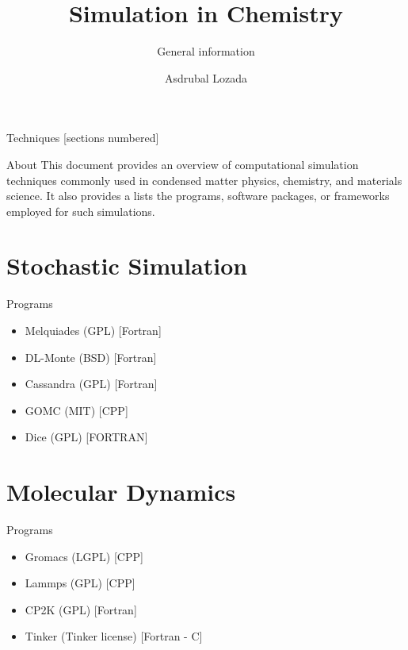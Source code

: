 \documentclass[10pt]{beamer}
\title{Simulation in Chemistry}
\subtitle{General information}
\date{}
\author{Asdrubal Lozada}
\begin{document}
\maketitle

\begin{frame}{Techniques}
  [sections numbered]
  \tableofcontents%
\end{frame}

\begin{frame}[frame]{About}
    This document provides an overview of computational simulation techniques commonly used in condensed matter physics, chemistry, and materials science. It also provides a lists the programs, software packages, or frameworks employed for such simulations.
\end{frame}

\section[Stochastic]{Stochastic Simulation}

\begin{frame}[fragile]{Programs}

  \begin{itemize}
      \item Melquiades (GPL) [Fortran]
      \item DL-Monte (BSD) [Fortran]
      \item Cassandra (GPL) [Fortran]
      \item GOMC (MIT) [CPP]
      \item Dice (GPL) [FORTRAN]
  \end{itemize}
\end{frame}

\section[Dynamics]{Molecular Dynamics}

\begin{frame}[fragile]{Programs}
	\begin{itemize}
	    \item Gromacs (LGPL) [CPP]
        \item Lammps (GPL) [CPP]
        \item CP2K (GPL) [Fortran]
        \item Tinker (Tinker license) [Fortran - C]
    \end{itemize}
\end{frame}
\end{document}
